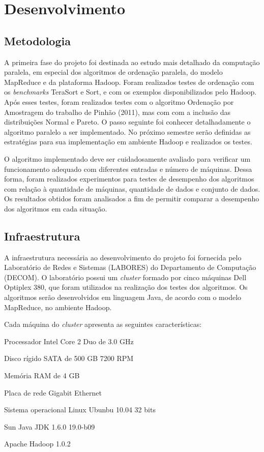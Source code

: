 \chapter{Desenvolvimento}
\label{cap:desenvolvimento}

\section{Metodologia}

A primeira fase do projeto foi destinada ao estudo mais detalhado da computação paralela, em especial dos algoritmos de ordenação paralela, do modelo MapReduce e da plataforma Hadoop. Foram realizados testes de ordenação com os \textit{benchmarks} TeraSort e Sort, e com os exemplos disponibilizados pelo Hadoop. Após esses testes, foram realizados testes com o algoritmo Ordenação por Amostragem do trabalho de Pinhão (2011), mas com com a inclusão das distribuições Normal e Pareto. O passo seguinte foi conhecer detalhadamente o algoritmo paralelo a ser implementado. No próximo semestre serão definidas as estratégias para sua implementação em ambiente Hadoop e realizados os testes. 

O algoritmo implementado deve ser cuidadosamente avaliado para verificar um funcionamento adequado com diferentes entradas e número de máquinas. Dessa forma, foram realizados experimentos para testes de desempenho dos algoritmos com relação à quantidade de máquinas, quantidade de dados e conjunto de dados.  Os resultados obtidos foram analisados a fim de permitir comparar a desempenho dos algoritmos em cada situação. 
 

\section{Infraestrutura}

A infraestrutura necessária ao desenvolvimento do projeto foi fornecida pelo Laboratório de Redes e Sistemas (LABORES) do Departamento de Computação (DECOM). O laboratório possui um \textit{cluster} formado por cinco máquinas Dell Optiplex 380, que foram utilizados na realização dos testes dos algoritmos. Os algoritmos serão desenvolvidos em linguagem Java, de acordo com o modelo MapReduce, no ambiente Hadoop. 

Cada máquina do \textit{cluster} apresenta as seguintes características:
\begin{packed_enum}
\item Processador Intel Core 2 Duo de 3.0 GHz
\item Disco rígido SATA de 500 GB 7200 RPM
\item Memória RAM de 4 GB
\item Placa de rede Gigabit Ethernet
\item Sistema operacional Linux Ubunbu 10.04 32 bits %
\item Sun Java JDK 1.6.0 19.0-b09 
\item Apache Hadoop 1.0.2
\end{packed_enum}


